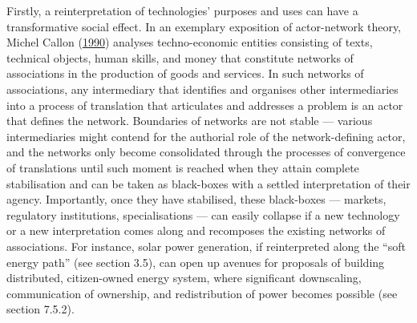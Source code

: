 \documentclass[a4paper, nobind]{templates/ociamthesis}
\begin{document}
Firstly, a reinterpretation of technologies' purposes and uses can have a transformative social effect. In an exemplary exposition of actor-network theory, Michel Callon (\protect\hyperlink{ref-callon_techno-economic_1990}{1990}) analyses techno-economic entities consisting of texts, technical objects, human skills, and money that constitute networks of associations in the production of goods and services. In such networks of associations, any intermediary that identifies and organises other intermediaries into a process of translation that articulates and addresses a problem is an actor that defines the network. Boundaries of networks are not stable --- various intermediaries might contend for the authorial role of the network-defining actor, and the networks only become consolidated through the processes of convergence of translations until such moment is reached when they attain complete stabilisation and can be taken as black-boxes with a settled interpretation of their agency. Importantly, once they have stabilised, these black-boxes --- markets, regulatory institutions, specialisations --- can easily collapse if a new technology or a new interpretation comes along and recomposes the existing networks of associations. For instance, solar power generation, if reinterpreted along the ``soft energy path'' (see section 3.5), can open up avenues for proposals of building distributed, citizen-owned energy system, where significant downscaling, communication of ownership, and redistribution of power becomes possible (see section 7.5.2).
\end{document}
